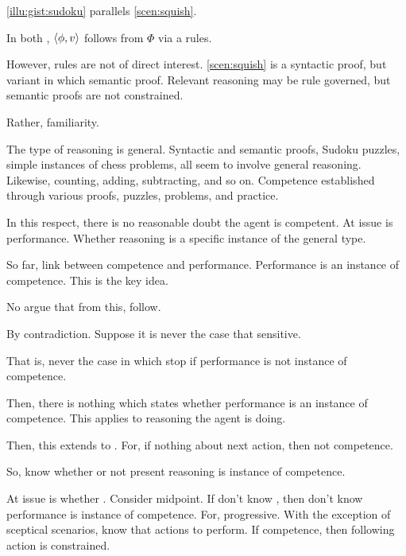\begin{note}
  \autoref{illu:gist:sudoku} parallels \autoref{scen:squish}.

  In both , \(\langle \phi, v \rangle\) follows from \(\Phi\) via a rules.

  However, rules are not of direct interest.
  \autoref{scen:squish} is a syntactic proof, but variant  in which semantic proof.
  Relevant reasoning may be rule governed, but semantic proofs are not constrained.

  Rather, familiarity.

  The type of reasoning is general.
  Syntactic and semantic proofs, Sudoku puzzles, simple instances of chess problems, all seem to involve general reasoning.
  Likewise, counting, adding, subtracting, and so on.
  Competence established through various proofs, puzzles, problems, and practice.

  In this respect, there is no reasonable doubt the agent is competent.
  At issue is performance.
  Whether reasoning is a specific instance of the general type.
\end{note}

\begin{note}
  So far, link between competence and performance.
  Performance is an instance of competence.
  This is the key idea.

  No argue that from this,  follow.
\end{note}

\begin{note}
  By contradiction.
  Suppose it is never the case that sensitive.

  That is, never the case in which stop if performance is not instance of competence.

  Then, there is nothing which states whether performance is an instance of competence.
  This applies to reasoning the agent is doing.

  Then, this extends to .
  For, if nothing about next action, then not competence.
\end{note}

\begin{note}
  So, know whether or not present reasoning is instance of competence.

  At issue is whether \fc{}.
  Consider midpoint.
  If don't know \fc{}, then don't know performance is instance of competence.
  For, progressive.
  With the exception of sceptical scenarios, know that actions to perform.
  If competence, then following action is constrained.
\end{note}

